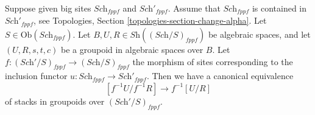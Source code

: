 \begin{lemma}
\label{lemma-quotient-stack-change-big-site}
Suppose given big sites $\textit{Sch}_{fppf}$ and $\textit{Sch}'_{fppf}$.
Assume that $\textit{Sch}_{fppf}$ is contained in $\textit{Sch}'_{fppf}$,
see Topologies, Section \ref{topologies-section-change-alpha}.
Let $S \in \text{Ob}(\textit{Sch}_{fppf})$.
Let $B, U, R \in \textit{Sh}((\textit{Sch}/S)_{fppf})$ be algebraic spaces,
and let $(U, R, s, t, c)$ be a groupoid in algebraic spaces over $B$.
Let $f : (\textit{Sch}'/S)_{fppf} \to (\textit{Sch}/S)_{fppf}$ the morphism
of sites corresponding to the inclusion functor
$u : \textit{Sch}_{fppf} \to \textit{Sch}'_{fppf}$.
Then we have a canonical equivalence
$$
[f^{-1}U/f^{-1}R]
\longrightarrow
f^{-1}[U/R]
$$
of stacks in groupoids over $(\textit{Sch}'/S)_{fppf}$.
\end{lemma}

